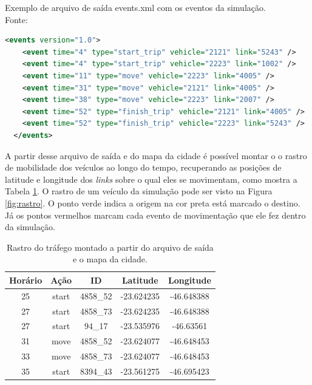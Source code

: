 {\begin{programruledcaption}{Exemplo de arquivo de saída events.xml com os eventos da simulação. \\Fonte: \citet{mabs2017} \label{file:events.xml}}
  \begin{lstlisting}[language=XML]
  <events version="1.0">
    <event time="4" type="start_trip" vehicle="2121" link="5243" />
    <event time="4" type="start_trip" vehicle="2223" link="1002" />
    <event time="11" type="move" vehicle="2223" link="4005" />
    <event time="31" type="move" vehicle="2121" link="4005" />
    <event time="38" type="move" vehicle="2223" link="2007" />
    <event time="52" type="finish_trip" vehicle="2121" link="4005" />
    <event time="52" type="finish_trip" vehicle="2223" link="5243" />
  </events>
  \end{lstlisting}
\end{programruledcaption}

  A partir desse arquivo de saída e do mapa da cidade é possível montar o o
rastro de mobilidade dos veículos ao longo do tempo, recuperando as posições de
latitude e longitude dos \emph{links} sobre o qual eles se movimentam, como
mostra a Tabela \ref{table:rastro}. O rastro de um veículo da simulação pode
ser visto na Figura \ref{fig:rastro}. O ponto verde indica a origem na cor
preta está marcado o destino. Já os pontos vermelhos marcam cada evento de
movimentação que ele fez dentro da simulação.

\begin{table}[!htb]
\centering
\begin{tabular}{|c|c|c|c|c|}
\hline
\textbf{Horário} & \textbf{Ação} & \textbf{ID} & \textbf{Latitude} & \textbf{Longitude} \\
\hline
25 & start & 4858\_52 & -23.624235 & -46.648388 \\
27 & start & 4858\_73 & -23.624235 & -46.648388 \\
27 & start & 94\_17 & -23.535976 & -46.63561    \\
31 & move & 4858\_52 & -23.624077 & -46.648453 \\
33 & move & 4858\_73 & -23.624077 & -46.648453 \\
35 & start & 8394\_43 & -23.561275 & -46.695423 \\
\hline
\end{tabular}
\caption[Rastro do tráfego] {Rastro do tráfego montado a partir do arquivo de saída e o mapa da cidade. \label{table:rastro}}
\end{table}

}
